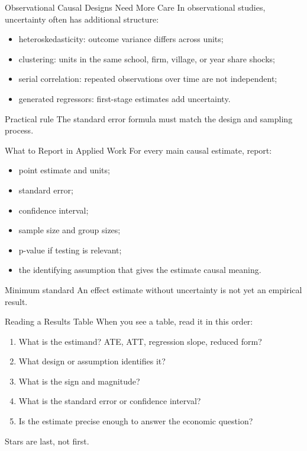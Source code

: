 \documentclass[11pt,aspectratio=169]{beamer}
\begin{document}
\begin{frame}{Observational Causal Designs Need More Care}
  In observational studies, uncertainty often has additional structure:
  \begin{itemize}
    \item heteroskedasticity: outcome variance differs across units;
    \item clustering: units in the same school, firm, village, or year share shocks;
    \item serial correlation: repeated observations over time are not independent;
    \item generated regressors: first-stage estimates add uncertainty.
  \end{itemize}
  \begin{block}{Practical rule}
    The standard error formula must match the design and sampling process.
  \end{block}
\end{frame}

\begin{frame}{What to Report in Applied Work}
  For every main causal estimate, report:
  \begin{itemize}
    \item point estimate and units;
    \item standard error;
    \item confidence interval;
    \item sample size and group sizes;
    \item p-value if testing is relevant;
    \item the identifying assumption that gives the estimate causal meaning.
  \end{itemize}
  \begin{block}{Minimum standard}
    An effect estimate without uncertainty is not yet an empirical result.
  \end{block}
\end{frame}

\begin{frame}{Reading a Results Table}
  When you see a table, read it in this order:
  \begin{enumerate}
    \item What is the estimand? ATE, ATT, regression slope, reduced form?
    \item What design or assumption identifies it?
    \item What is the sign and magnitude?
    \item What is the standard error or confidence interval?
    \item Is the estimate precise enough to answer the economic question?
  \end{enumerate}
  \vspace{0.3em}
  Stars are last, not first.
\end{frame}
\end{document}
